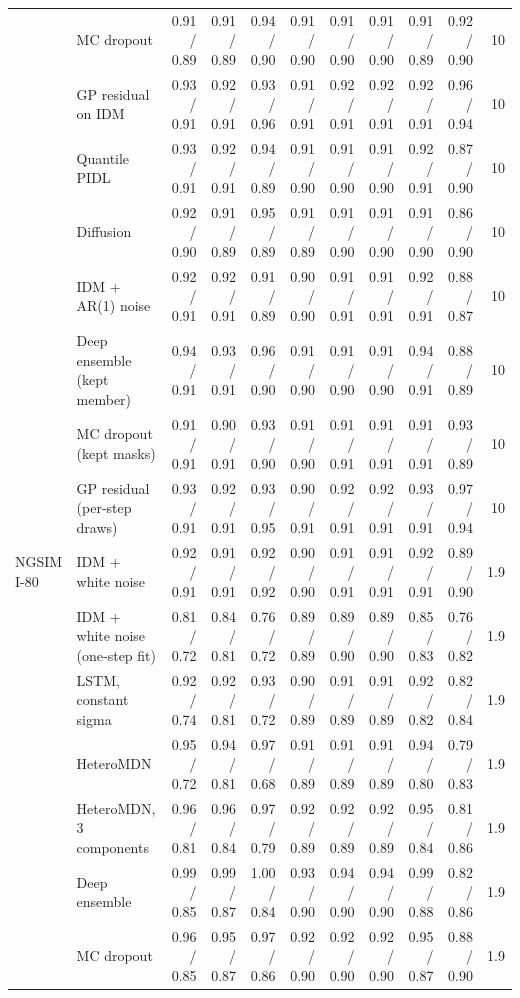 \begin{longtable}{llrrrrrrrrr}
 & MC dropout & 0.91 / 0.89 & 0.91 / 0.89 & 0.94 / 0.90 & 0.91 / 0.90 & 0.91 / 0.90 & 0.91 / 0.90 & 0.91 / 0.89 & 0.92 / 0.90 & 10 \\
 & GP residual on IDM & 0.93 / 0.91 & 0.92 / 0.91 & 0.93 / 0.96 & 0.91 / 0.91 & 0.92 / 0.91 & 0.92 / 0.91 & 0.92 / 0.91 & 0.96 / 0.94 & 10 \\
 & Quantile PIDL & 0.93 / 0.91 & 0.92 / 0.91 & 0.94 / 0.89 & 0.91 / 0.90 & 0.91 / 0.90 & 0.91 / 0.90 & 0.92 / 0.91 & 0.87 / 0.90 & 10 \\
 & Diffusion & 0.92 / 0.90 & 0.91 / 0.89 & 0.95 / 0.89 & 0.91 / 0.89 & 0.91 / 0.90 & 0.91 / 0.90 & 0.91 / 0.90 & 0.86 / 0.90 & 10 \\
 & IDM + AR(1) noise & 0.92 / 0.91 & 0.92 / 0.91 & 0.91 / 0.89 & 0.90 / 0.90 & 0.91 / 0.91 & 0.91 / 0.91 & 0.92 / 0.91 & 0.88 / 0.87 & 10 \\
 & Deep ensemble (kept member) & 0.94 / 0.91 & 0.93 / 0.91 & 0.96 / 0.90 & 0.91 / 0.90 & 0.91 / 0.90 & 0.91 / 0.90 & 0.94 / 0.91 & 0.88 / 0.89 & 10 \\
 & MC dropout (kept masks) & 0.91 / 0.91 & 0.90 / 0.91 & 0.93 / 0.90 & 0.91 / 0.90 & 0.91 / 0.91 & 0.91 / 0.91 & 0.91 / 0.91 & 0.93 / 0.89 & 10 \\
 & GP residual (per-step draws) & 0.93 / 0.91 & 0.92 / 0.91 & 0.93 / 0.95 & 0.90 / 0.91 & 0.92 / 0.91 & 0.92 / 0.91 & 0.93 / 0.91 & 0.97 / 0.94 & 10 \\
\midrule
NGSIM I-80 & IDM + white noise & 0.92 / 0.91 & 0.91 / 0.91 & 0.92 / 0.92 & 0.90 / 0.90 & 0.91 / 0.91 & 0.91 / 0.91 & 0.92 / 0.91 & 0.89 / 0.90 & 1.9 \\
 & IDM + white noise (one-step fit) & 0.81 / 0.72 & 0.84 / 0.81 & 0.76 / 0.72 & 0.89 / 0.89 & 0.89 / 0.90 & 0.89 / 0.90 & 0.85 / 0.83 & 0.76 / 0.82 & 1.9 \\
 & LSTM, constant sigma & 0.92 / 0.74 & 0.92 / 0.81 & 0.93 / 0.72 & 0.90 / 0.89 & 0.91 / 0.89 & 0.91 / 0.89 & 0.92 / 0.82 & 0.82 / 0.84 & 1.9 \\
 & HeteroMDN & 0.95 / 0.72 & 0.94 / 0.81 & 0.97 / 0.68 & 0.91 / 0.89 & 0.91 / 0.89 & 0.91 / 0.89 & 0.94 / 0.80 & 0.79 / 0.83 & 1.9 \\
 & HeteroMDN, 3 components & 0.96 / 0.81 & 0.96 / 0.84 & 0.97 / 0.79 & 0.92 / 0.89 & 0.92 / 0.89 & 0.92 / 0.89 & 0.95 / 0.84 & 0.81 / 0.86 & 1.9 \\
 & Deep ensemble & 0.99 / 0.85 & 0.99 / 0.87 & 1.00 / 0.84 & 0.93 / 0.90 & 0.94 / 0.90 & 0.94 / 0.90 & 0.99 / 0.88 & 0.82 / 0.86 & 1.9 \\
 & MC dropout & 0.96 / 0.85 & 0.95 / 0.87 & 0.97 / 0.86 & 0.92 / 0.90 & 0.92 / 0.90 & 0.92 / 0.90 & 0.95 / 0.87 & 0.88 / 0.90 & 1.9 \\

\end{longtable}
